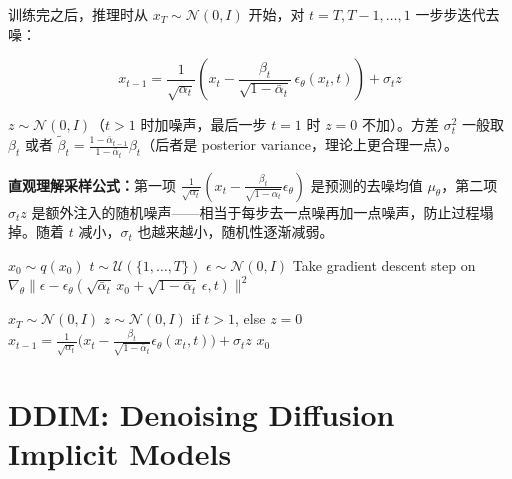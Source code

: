 \documentclass[11pt,a4paper]{article}
\theoremstyle{definition}
\newcommand{\N}{\mathcal{N}}          %
\newcommand{\Unif}{\mathcal{U}}       %
\newcommand{\alphat}{\bar{\alpha}_t}
\begin{document}
训练完之后，推理时从 $x_T \sim \N(0, I)$ 开始，对 $t = T, T-1, \dots, 1$ 一步步迭代去噪：

\begin{equation}\label{eq:ddpm_sample}
    x_{t-1} = \frac{1}{\sqrt{\alpha_t}}\!\left( x_t - \frac{\beta_t}{\sqrt{1 - \alphat}}\, \epsilon_\theta(x_t, t) \right) + \sigma_t z
\end{equation}

$z \sim \N(0, I)$（$t > 1$ 时加噪声，最后一步 $t=1$ 时 $z=0$ 不加）。方差 $\sigma_t^2$ 一般取 $\beta_t$ 或者 $\tilde{\beta}_t = \frac{1 - \bar{\alpha}_{t-1}}{1 - \alphat}\beta_t$（后者是 posterior variance，理论上更合理一点）。

\textbf{直观理解采样公式：}第一项 $\frac{1}{\sqrt{\alpha_t}}(x_t - \frac{\beta_t}{\sqrt{1-\alphat}}\epsilon_\theta)$ 是预测的去噪均值 $\mu_\theta$，第二项 $\sigma_t z$ 是额外注入的随机噪声——相当于每步去一点噪再加一点噪声，防止过程塌掉。随着 $t$ 减小，$\sigma_t$ 也越来越小，随机性逐渐减弱。

\begin{algorithm}[ht]
\caption{DDPM Training}
\label{alg:ddpm_train}
\begin{algorithmic}[1]
    \State $x_0 \sim q(x_0)$
    \State $t \sim \Unif(\{1, \dots, T\})$
    \State $\epsilon \sim \N(0, I)$
    \State Take gradient descent step on $\nabla_\theta \| \epsilon - \epsilon_\theta(\sqrt{\alphat}\, x_0 + \sqrt{1 - \alphat}\, \epsilon, t) \|^2$
\EndWhile
\end{algorithmic}
\end{algorithm}

\begin{algorithm}[ht]
\caption{DDPM Sampling}
\label{alg:ddpm_sample}
\begin{algorithmic}[1]
\State $x_T \sim \N(0, I)$
    \State $z \sim \N(0, I)$ if $t > 1$, else $z = 0$
    \State $x_{t-1} = \frac{1}{\sqrt{\alpha_t}}\big( x_t - \frac{\beta_t}{\sqrt{1 - \alphat}} \epsilon_\theta(x_t, t) \big) + \sigma_t z$
\EndFor
\State \Return $x_0$
\end{algorithmic}
\end{algorithm}


\section{DDIM: Denoising Diffusion Implicit Models}
\end{document}
